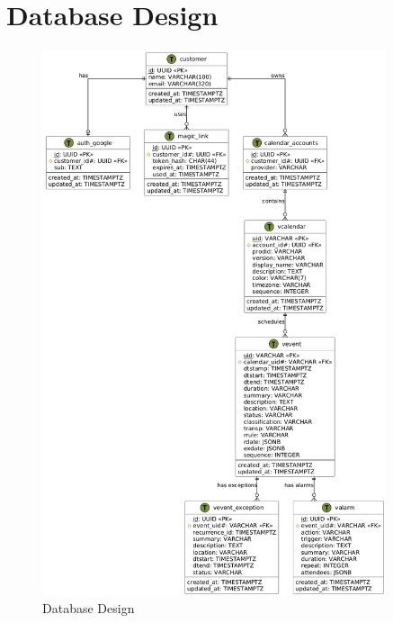 \documentclass[12pt,a4paper]{report}
\begin{document}

















\section{Database Design}

\begin{figure}[!h]
    \centering
    \includegraphics[width=0.9\textwidth]{images/docs/diagrams/er/database/Database Design.png}
    \caption{Database Design}
    \label{fig:database-design}
\end{figure}
\end{document}
